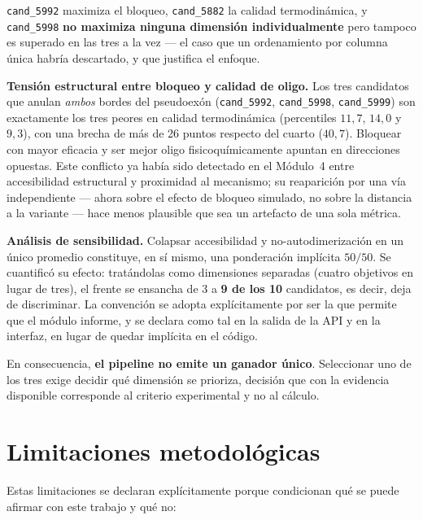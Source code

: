 \documentclass[11pt,a4paper]{article}
\begin{document}
\texttt{cand\_5992} maximiza el bloqueo, \texttt{cand\_5882} la calidad termodinámica, y \texttt{cand\_5998} \textbf{no maximiza ninguna dimensión individualmente} pero tampoco es superado en las tres a la vez --- el caso que un ordenamiento por columna única habría descartado, y que justifica el enfoque.

\textbf{Tensión estructural entre bloqueo y calidad de oligo.} Los tres candidatos que anulan \emph{ambos} bordes del pseudoexón (\texttt{cand\_5992}, \texttt{cand\_5998}, \texttt{cand\_5999}) son exactamente los tres peores en calidad termodinámica (percentiles $11{,}7$, $14{,}0$ y $9{,}3$), con una brecha de más de 26 puntos respecto del cuarto ($40{,}7$). Bloquear con mayor eficacia y ser mejor oligo fisicoquímicamente apuntan en direcciones opuestas. Este conflicto ya había sido detectado en el Módulo~4 entre accesibilidad estructural y proximidad al mecanismo; su reaparición por una vía independiente --- ahora sobre el efecto de bloqueo simulado, no sobre la distancia a la variante --- hace menos plausible que sea un artefacto de una sola métrica.

\textbf{Análisis de sensibilidad.} Colapsar accesibilidad y no-autodimerización en un único promedio constituye, en sí mismo, una ponderación implícita $50/50$. Se cuantificó su efecto: tratándolas como dimensiones separadas (cuatro objetivos en lugar de tres), el frente se ensancha de 3 a \textbf{9 de los 10} candidatos, es decir, deja de discriminar. La convención se adopta explícitamente por ser la que permite que el módulo informe, y se declara como tal en la salida de la API y en la interfaz, en lugar de quedar implícita en el código.

En consecuencia, \textbf{el pipeline no emite un ganador único}. Seleccionar uno de los tres exige decidir qué dimensión se prioriza, decisión que con la evidencia disponible corresponde al criterio experimental y no al cálculo.

\section{Limitaciones metodológicas}

Estas limitaciones se declaran explícitamente porque condicionan qué se puede afirmar con este trabajo y qué no:
\end{document}

